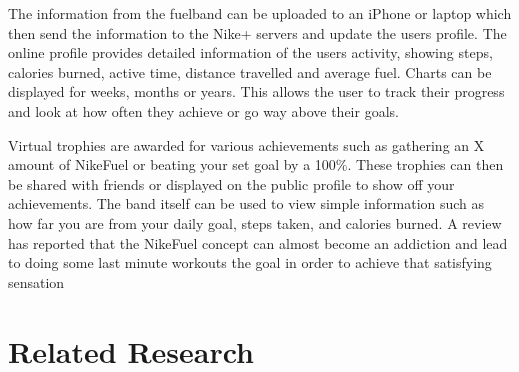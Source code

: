 The information from the fuelband can be uploaded to an iPhone or laptop which then send the information to the Nike+ servers and update the users profile. The online profile provides detailed information of the users activity, showing steps, calories burned, active time, distance travelled and average fuel. Charts can be displayed for weeks, months or years. This allows the user to track their progress and look at how often they achieve or go way above their goals.\cite{fuelbandTechSpce} 

Virtual trophies are awarded for various achievements such as gathering an X amount of NikeFuel or beating your set goal by a 100\%. These trophies can then be shared with friends or displayed on the public profile to show off your achievements. The band itself can be used to view simple information such as how far you are from your daily goal, steps taken, and calories burned. A review has reported that the NikeFuel concept can almost become an addiction and lead to doing some last minute workouts the goal in order to achieve that satisfying sensation \cite{fuelbandDcRain}


\section{Related Research}

